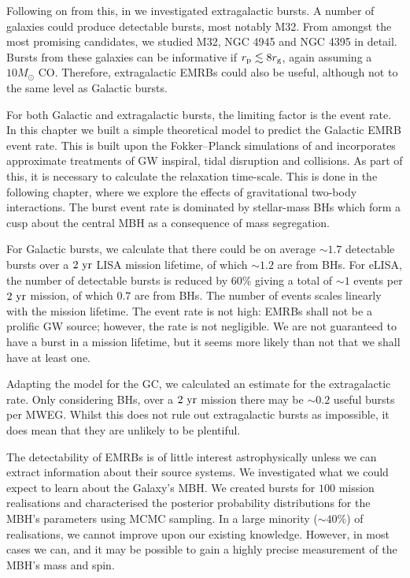 Following on from this, in  we investigated extragalactic bursts. A number of galaxies could produce detectable bursts, most notably M32. From amongst the most promising candidates, we studied M32, NGC 4945 and NGC 4395 in detail. Bursts from these galaxies can be informative if $r_\mathrm{p} \lesssim 8 r_\mathrm{g}$, again assuming a $10 M_\odot$ CO. Therefore, extragalactic EMRBs could also be useful, although not to the same level as Galactic bursts.

For both Galactic and extragalactic bursts, the limiting factor is the event rate. In this chapter we built a simple theoretical model to predict the Galactic EMRB event rate. This is built upon the Fokker--Planck simulations of \citet{Alexander2009} and incorporates approximate treatments of GW inspiral, tidal disruption and collisions. As part of this, it is necessary to calculate the relaxation time-scale. This is done in the following chapter, where we explore the effects of gravitational two-body interactions. The burst event rate is dominated by stellar-mass BHs which form a cusp about the central MBH as a consequence of mass segregation.

For Galactic bursts, we calculate that there could be on average $\sim1.7$ detectable bursts over a $2~\mathrm{yr}$ LISA mission lifetime, of which $\sim1.2$ are from BHs. For eLISA, the number of detectable bursts is reduced by $60\%$ giving a total of $\sim1$ events per $2~\mathrm{yr}$ mission, of which $0.7$ are from BHs. The number of events scales linearly with the mission lifetime. The event rate is not high: EMRBs shall not be a prolific GW source; however, the rate is not negligible. We are not guaranteed to have a burst in a mission lifetime, but it seems more likely than not that we shall have at least one.

Adapting the model for the GC, we calculated an estimate for the extragalactic rate. Only considering BHs, over a $2~\mathrm{yr}$ mission there may be $\sim0.2$ useful bursts per MWEG. Whilst this does not rule out extragalactic bursts as impossible, it does mean that they are unlikely to be plentiful.

The detectability of EMRBs is of little interest astrophysically unless we can extract information about their source systems. We investigated what we could expect to learn about the Galaxy's MBH. We created bursts for $100$ mission realisations and characterised the posterior probability distributions for the MBH's parameters using MCMC sampling. In a large minority ($\sim40\%$) of realisations, we cannot improve upon our existing knowledge. However, in most cases we can, and it may be possible to gain a highly precise measurement of the MBH's mass and spin.


